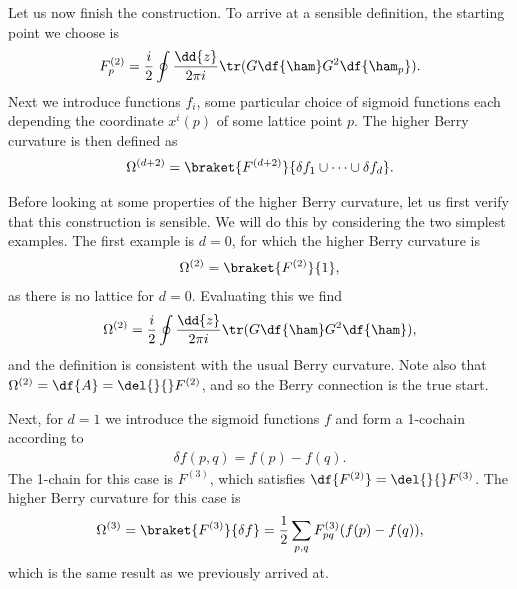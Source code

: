Let us now finish the construction. To arrive at a sensible definition, the starting point we choose is
\begin{align*}
	F^{(2)}_{p} = \frac{i}{2}\oint\frac{\dd{z}}{2\pi i}\tr(G\df{\ham}G^{2}\df{\ham_{p}}).
\end{align*}
Next we introduce functions $f_{i}$, some particular choice of sigmoid functions each depending the coordinate $x^{i}(p)$ of some lattice point $p$. The higher Berry curvature is then defined as
\begin{align*}
	\Omega^{(d + 2)} = \braket{F^{(d + 2)}}{\delta f_{1}\cup\dots\cup\delta f_{d}}.
\end{align*}

Before looking at some properties of the higher Berry curvature, let us first verify that this construction is sensible. We will do this by considering the two simplest examples. The first example is $d = 0$, for which the higher Berry curvature is
\begin{align*}
	\Omega^{(2)} = \braket{F^{(2)}}{1},
\end{align*}
as there is no lattice for $d = 0$. Evaluating this we find
\begin{align*}
	\Omega^{(2)} = \frac{i}{2}\oint\frac{\dd{z}}{2\pi i}\tr(G\df{\ham}G^{2}\df{\ham}),
\end{align*}
and the definition is consistent with the usual Berry curvature. Note also that $\Omega^{(2)} = \df{A} = \del{}{}F^{(2)}$, and so the Berry connection is the true start.

Next, for $d = 1$ we introduce the sigmoid functions $f$ and form a 1-cochain according to
\begin{align*}
	\delta f(p, q) = f(p) - f(q).
\end{align*}
The 1-chain for this case is $F^{(3)}$, which satisfies $\df{F^{(2)}} = \del{}{}F^{(3)}$. The higher Berry curvature for this case is
\begin{align*}
	\Omega^{(3)} = \braket{F^{(3)}}{\delta f} = \frac{1}{2}\sum\limits_{p, q}F_{pq}^{(3)}(f(p) - f(q)),
\end{align*}
which is the same result as we previously arrived at.


